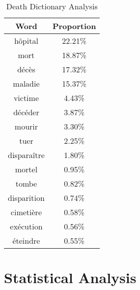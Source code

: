 \begin{table}[]
\caption{Death Dictionary Analysis}
\label{tab:death freqs}
\centering
\begin{tabular}{@{}cc@{}}
\toprule
Word      & Proportion \\ \midrule
hôpital     & 22.21\% \\
mort        & 18.87\% \\
décès       & 17.32\% \\
maladie     & 15.37\% \\
victime     & 4.43\%  \\
décéder     & 3.87\%  \\
mourir      & 3.30\%  \\
tuer        & 2.25\%  \\
disparaître & 1.80\%  \\
mortel      & 0.95\%  \\
tombe       & 0.82\%  \\
disparition & 0.74\%  \\
cimetière   & 0.58\%  \\
exécution   & 0.56\%  \\
éteindre    & 0.55\%  \\ \bottomrule
\end{tabular}
\end{table}

\section{Statistical Analysis}
